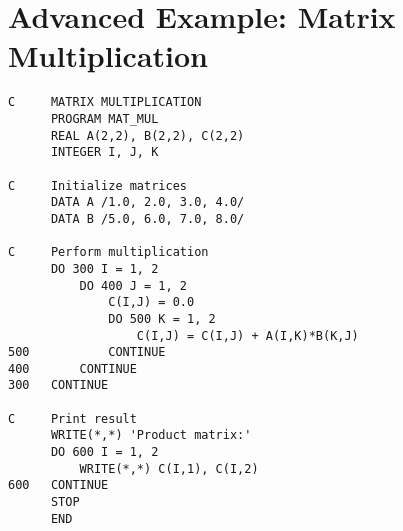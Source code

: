 \documentclass{book}
\begin{document}
\section*{Advanced Example: Matrix Multiplication}
\begin{verbatim}
C     MATRIX MULTIPLICATION
      PROGRAM MAT_MUL
      REAL A(2,2), B(2,2), C(2,2)
      INTEGER I, J, K
      
C     Initialize matrices
      DATA A /1.0, 2.0, 3.0, 4.0/
      DATA B /5.0, 6.0, 7.0, 8.0/

C     Perform multiplication
      DO 300 I = 1, 2
          DO 400 J = 1, 2
              C(I,J) = 0.0
              DO 500 K = 1, 2
                  C(I,J) = C(I,J) + A(I,K)*B(K,J)
500           CONTINUE
400       CONTINUE
300   CONTINUE

C     Print result
      WRITE(*,*) 'Product matrix:'
      DO 600 I = 1, 2
          WRITE(*,*) C(I,1), C(I,2)
600   CONTINUE
      STOP
      END
\end{verbatim}
\end{document}
